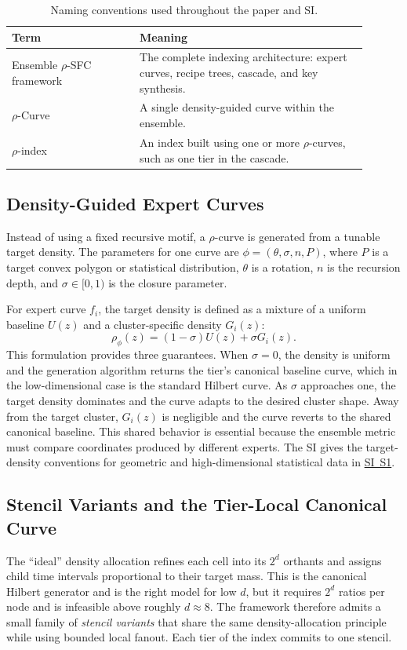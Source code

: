 \documentclass[11pt]{article}
\newcommand{\rhophi}{\rho_{\phi}}
\begin{document}
\begin{table}[t]
\centering
\begin{tabular}{>{\raggedright\arraybackslash}p{0.32\linewidth}p{0.58\linewidth}}
\toprule
\textbf{Term} & \textbf{Meaning}\\
\midrule
Ensemble $\rho$-SFC framework & The complete indexing architecture: expert curves, recipe trees, cascade, and key synthesis.\\
$\rho$-Curve & A single density-guided curve within the ensemble.\\
$\rho$-index & An index built using one or more $\rho$-curves, such as one tier in the cascade.\\
\bottomrule
\end{tabular}
\caption{Naming conventions used throughout the paper and SI.}
\label{tab:naming}
\end{table}

\subsection{Density-Guided Expert Curves}
Instead of using a fixed recursive motif, a $\rho$-curve is generated from a tunable target density. The parameters for one curve are $\phi=(\theta,\sigma,n,P)$, where $P$ is a target convex polygon or statistical distribution, $\theta$ is a rotation, $n$ is the recursion depth, and $\sigma\in[0,1)$ is the closure parameter.

For expert curve $f_i$, the target density is defined as a mixture of a uniform baseline $U(z)$ and a cluster-specific density $G_i(z)$:
\begin{equation}
\rhophi(z)=(1-\sigma)U(z)+\sigma G_i(z).
\label{eq:density-mixture}
\end{equation}
This formulation provides three guarantees. When $\sigma=0$, the density is uniform and the generation algorithm returns the tier's canonical baseline curve, which in the low-dimensional case is the standard Hilbert curve. As $\sigma$ approaches one, the target density dominates and the curve adapts to the desired cluster shape. Away from the target cluster, $G_i(z)$ is negligible and the curve reverts to the shared canonical baseline. This shared behavior is essential because the ensemble metric must compare coordinates produced by different experts. The SI gives the target-density conventions for geometric and high-dimensional statistical data in \hyperref[sec:si-density]{SI~S1}.

\subsection{Stencil Variants and the Tier-Local Canonical Curve}
\label{sec:framework-stencils}
The ``ideal'' density allocation refines each cell into its $2^d$ orthants and assigns child time intervals proportional to their target mass. This is the canonical Hilbert generator and is the right model for low $d$, but it requires $2^d$ ratios per node and is infeasible above roughly $d\approx 8$. The framework therefore admits a small family of \emph{stencil variants} that share the same density-allocation principle while using bounded local fanout. Each tier of the index commits to one stencil.
\end{document}

